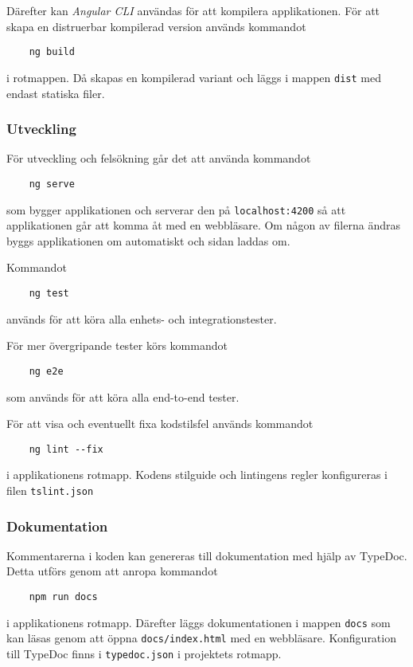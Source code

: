 \documentclass[techdoc/techdoc.tex]{subfiles}
\begin{document}
Därefter kan \emph{Angular CLI} användas för att kompilera applikationen. För
att skapa en distruerbar kompilerad version används kommandot
\begin{lstlisting}
    ng build
\end{lstlisting}
i rotmappen. Då skapas en kompilerad variant och läggs i mappen \texttt{dist}
med endast statiska filer.

\subsubsection{Utveckling}
För utveckling och felsökning går det att använda kommandot
\begin{lstlisting}
    ng serve
\end{lstlisting}
som bygger applikationen och serverar den på \texttt{localhost:4200} så att
applikationen går att komma åt med en webbläsare. Om någon av filerna ändras
byggs applikationen om automatiskt och sidan laddas om.

Kommandot
\begin{lstlisting}
    ng test
\end{lstlisting}
används för att köra alla enhets- och integrationstester.

För mer övergripande tester körs kommandot
\begin{lstlisting}
    ng e2e
\end{lstlisting}
som används för att köra alla end-to-end tester.

För att visa och eventuellt fixa kodstilsfel används kommandot
\begin{lstlisting}
    ng lint --fix
\end{lstlisting}
i applikationens rotmapp. Kodens stilguide och lintingens regler konfigureras i
filen \texttt{tslint.json}

\subsubsection{Dokumentation}
Kommentarerna i koden kan genereras till dokumentation med hjälp av TypeDoc.
Detta utförs genom att anropa kommandot
\begin{lstlisting}
    npm run docs
\end{lstlisting}
i applikationens rotmapp. Därefter läggs dokumentationen i mappen \texttt{docs}
som kan läsas genom att öppna \texttt{docs/index.html} med en webbläsare.
Konfiguration till TypeDoc finns i \texttt{typedoc.json} i projektets rotmapp.
\end{document}
